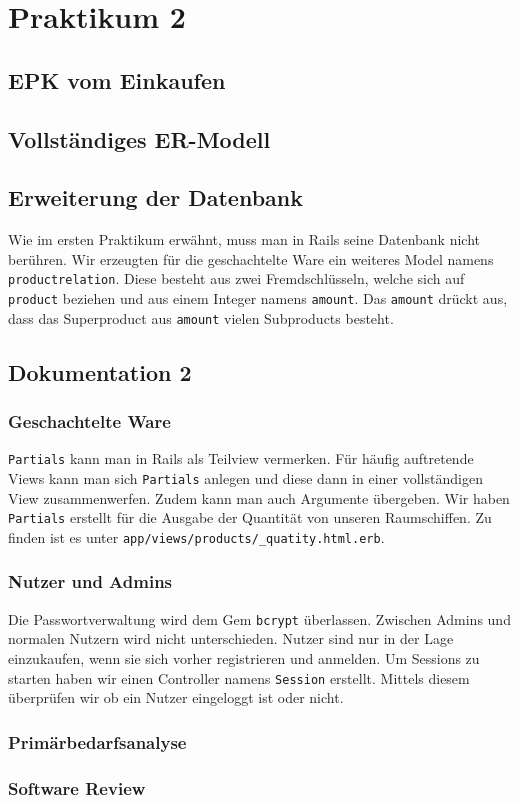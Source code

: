 \section{Praktikum 2}

\subsection{EPK vom Einkaufen}

\subsection{Vollst\"andiges ER-Modell}

\subsection{Erweiterung der Datenbank}
Wie im ersten Praktikum erw\"ahnt, muss man in Rails seine Datenbank nicht ber\"uhren. Wir erzeugten f\"ur die geschachtelte Ware ein weiteres Model namens \texttt{productrelation}. Diese besteht aus zwei Fremdschl\"usseln, welche sich auf \texttt{product} beziehen und aus einem Integer namens \texttt{amount}. Das \texttt{amount} dr\"uckt aus, dass das Superproduct aus \texttt{amount} vielen Subproducts besteht. 

\subsection{Dokumentation 2}

\subsubsection{Geschachtelte Ware}
\texttt{Partials} kann man in Rails als Teilview vermerken. F\"ur h\"aufig auftretende Views kann man sich \texttt{Partials} anlegen und diese dann in einer vollst\"andigen View zusammenwerfen. Zudem kann man auch Argumente \"ubergeben. Wir haben \texttt{Partials} erstellt f\"ur die Ausgabe der Quantit\"at von unseren Raumschiffen. Zu finden ist es unter \texttt{app/views/products/\_quatity.html.erb}. 

\subsubsection{Nutzer und Admins}
Die Passwortverwaltung wird dem Gem \texttt{bcrypt} \"uberlassen. Zwischen Admins und normalen Nutzern wird nicht unterschieden. Nutzer sind nur in der Lage einzukaufen, wenn sie sich vorher registrieren und anmelden. Um Sessions zu starten haben wir einen Controller namens \texttt{Session} erstellt. Mittels diesem \"uberpr\"ufen wir ob ein Nutzer eingeloggt ist oder nicht.

\subsubsection{Prim\"arbedarfsanalyse}

\subsubsection{Software Review}

